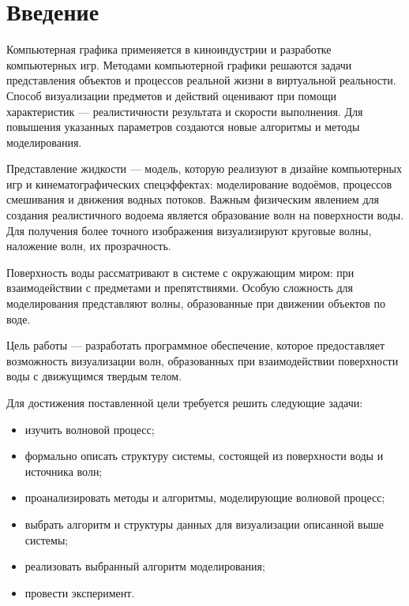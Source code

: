 \chapter*{Введение}

Компьютерная графика применяется в киноиндустрии и разработке компьютерных игр. Методами компьютерной графики решаются задачи представления объектов и процессов реальной жизни в виртуальной реальности. Способ визуализации предметов и действий оценивают при помощи характеристик --- реалистичности результата и скорости выполнения. Для повышения указанных параметров создаются новые алгоритмы и методы моделирования.

Представление жидкости --- модель, которую реализуют в дизайне компьютерных игр и кинематографических спецэффектах: моделирование водоёмов, процессов смешивания и движения водных потоков. Важным физическим явлением для создания реалистичного водоема является образование волн на поверхности воды. Для получения более точного изображения визуализируют круговые волны, наложение волн, их прозрачность.

Поверхность воды рассматривают в системе с окружающим миром: при взаимодействии с предметами и препятствиями. Особую сложность для моделирования представляют волны, образованные при движении объектов по воде.

Цель работы --- разработать программное обеспечение, которое предоставляет возможность визуализации волн, образованных при взаимодействии поверхности воды с движущимся твердым телом.

Для достижения поставленной цели требуется решить следующие задачи:

\begin{itemize}
	\item изучить волновой процесс;
	\item формально описать структуру системы, состоящей из поверхности воды и источника волн;
	\item проанализировать методы и алгоритмы, моделирующие волновой процесс;
	\item выбрать алгоритм и структуры данных для визуализации описанной выше системы;
	\item реализовать выбранный алгоритм моделирования;
	\item провести эксперимент.
\end{itemize}
